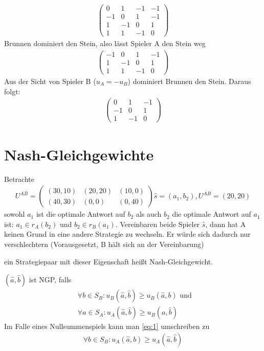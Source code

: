 \begin{bsp}
	\begin{align*}
		\begin{pmatrix}
			0 & 1 & -1 & -1 \\
			-1 & 0 & 1 & -1 \\
			1 & -1 & 0 & 1 \\
			1 & 1 & -1 & 0
		\end{pmatrix}
	\end{align*}
	Brunnen dominiert den Stein, also lässt Spieler A den Stein weg
	\begin{align*}
		\begin{pmatrix}
			-1 & 0 & 1 & -1 \\
			1 & -1 & 0 & 1 \\
			1 & 1 & -1 & 0
		\end{pmatrix}
	\end{align*}	
	Aus der Sicht von Spieler B ($u_A=-u_B$) dominiert Brunnen den Stein. Daraus folgt: 
	\begin{align*}
		\begin{pmatrix}
			 0 & 1 & -1 \\
			-1 & 0 & 1 \\
			1 & -1 & 0
		\end{pmatrix}
	\end{align*}	
\end{bsp}

\section{Nash-Gleichgewichte}

Betrachte 
\begin{align*}
	U^{AB}= \begin{pmatrix}
		(30,10) & (20,20) & (10,0) \\
		(40,30) & (0,0) & (0,40)
	\end{pmatrix}
	\hat{s}=(a_1,b_2), U^{AB}= (20,20)
\end{align*}
sowohl $a_1$ ist die optimale Antwort auf $b_2$ als auch $b_2$ die optimale Antwort auf $a_1$ ist: $a_1 \in r_A(b_2) $ und $b_2 \in r_B(a_1)$. Vereinbaren beide Spieler $\hat{s}$, dann hat A keinen Grund in eine andere Strategie zu wechseln. Er würde sich dadurch nur verschlechtern (Vorausgesetzt, B hält sich an der Vereinbarung) 

ein Strategiepaar mit dieser Eigenschaft heißt Nash-Gleichgewicht. 

\begin{defi}
	$(\hat{a}, \hat{b})$ ist NGP, falls 
	\begin{align}
		\label{eq:1}
		& \forall b \in S_B : u_B(\hat{a}, \hat{b} ) \geq u_B(\hat{a}, b) \text{ und } \\
		& \forall a \in S_A : u_A(\hat{a}, \hat{b} ) \geq u_B(a, \hat{b}) 
	\end{align}
	Im Falle eines Nullsummenspiels kann man \ref{eq:1} umschreiben zu 
	\begin{align}
		\label{eq:2}
		\forall b \in S_B : u_A(\hat{a}, b) \geq u_A(\hat{a}, \hat{b})
	\end{align} 
\end{defi}